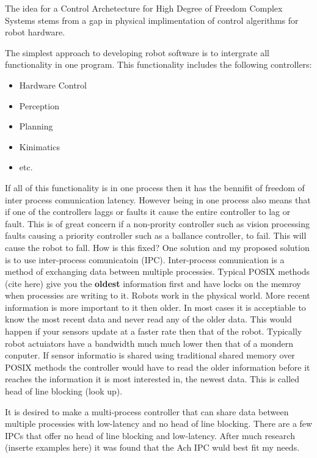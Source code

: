 


The idea for a Control Archetecture for High Degree of Freedom Complex Systems stems from a gap in physical implimentation of control algerithms for robot hardware.

The simplest approach to developing robot software is to intergrate all functionality in one program.  
This functionality includes the following controllers:
\begin{itemize}
\item Hardware Control
\item Perception
\item Planning
\item Kinimatics
\item etc.
\end{itemize}

If all of this functionality is in one process then it has the bennifit of freedom of inter process comunication latency.
However being in one process also means that if one of the controllers laggs or faults it cause the entire controller to lag or fault.
This is of great concern if a non-prority controller such as vision processing faults causing a priority controller such as a ballance controller, to fail.
This will cause the robot to fall.
How is this fixed?
One solution and my proposed solution is to use inter-process comunicatoin (IPC).
Inter-process comunication is a method of exchanging data between multiple processies.
Typical POSIX methods (cite here) give you the \textbf{oldest} information first and have locks on the memroy when processies are writing to it.
Robots work in the physical world. 
More recent information is more important to it then older.
In most cases it is acceptiable to know the most recent data and never read any of the older data.
This would happen if your sensors update at a faster rate then that of the robot.
Typically robot actuiators have a bandwidth much much lower then that of a mondern conputer.
If sensor informatio is shared using traditional shared memory over POSIX methods the controller would have to read the older information before it reaches the information it is most interested in, the newest data.
This is called head of line blocking (look up).

It is desired to make a multi-process controller that can share data between multiple processies with low-latency and no head of line blocking.
There are a few IPCs that offer no head of line blocking and low-latency.  
After much research (inserte examples here) it was found that the Ach IPC wuld best fit my needs.


